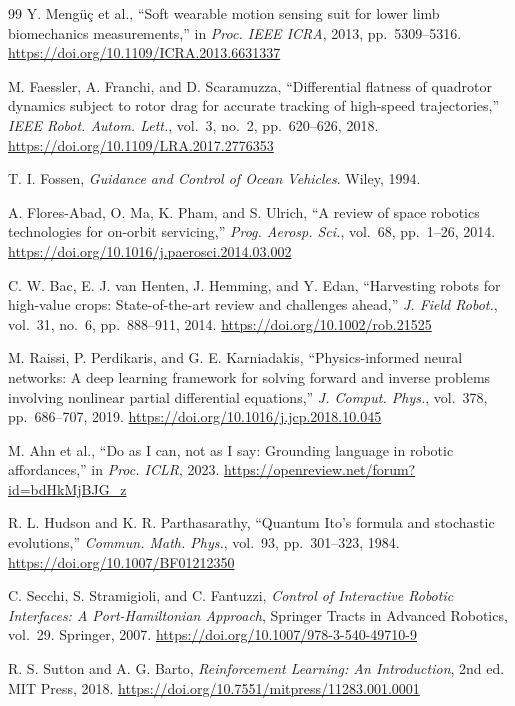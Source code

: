 \documentclass[11pt]{article}
\begin{document}
\begin{thebibliography}{99}
Y. Meng\"{u}\c{c} et al.,
``Soft wearable motion sensing suit for lower limb biomechanics
measurements,''
in \emph{Proc. IEEE ICRA}, 2013, pp.~5309--5316.
\url{https://doi.org/10.1109/ICRA.2013.6631337}

M. Faessler, A. Franchi, and D. Scaramuzza,
``Differential flatness of quadrotor dynamics subject to rotor drag for
accurate tracking of high-speed trajectories,''
\emph{IEEE Robot. Autom. Lett.}, vol.~3, no.~2, pp.~620--626, 2018.
\url{https://doi.org/10.1109/LRA.2017.2776353}

T. I. Fossen,
\emph{Guidance and Control of Ocean Vehicles}.
Wiley, 1994.

A. Flores-Abad, O. Ma, K. Pham, and S. Ulrich,
``A review of space robotics technologies for on-orbit servicing,''
\emph{Prog. Aerosp. Sci.}, vol.~68, pp.~1--26, 2014.
\url{https://doi.org/10.1016/j.paerosci.2014.03.002}

C. W. Bac, E. J. van Henten, J. Hemming, and Y. Edan,
``Harvesting robots for high-value crops: State-of-the-art review and
challenges ahead,''
\emph{J. Field Robot.}, vol.~31, no.~6, pp.~888--911, 2014.
\url{https://doi.org/10.1002/rob.21525}

M. Raissi, P. Perdikaris, and G. E. Karniadakis,
``Physics-informed neural networks: A deep learning framework for solving
forward and inverse problems involving nonlinear partial differential
equations,''
\emph{J. Comput. Phys.}, vol.~378, pp.~686--707, 2019.
\url{https://doi.org/10.1016/j.jcp.2018.10.045}

M. Ahn et al.,
``Do as I can, not as I say: Grounding language in robotic affordances,''
in \emph{Proc. ICLR}, 2023.
\url{https://openreview.net/forum?id=bdHkMjBJG_z}

R. L. Hudson and K. R. Parthasarathy,
``Quantum Ito's formula and stochastic evolutions,''
\emph{Commun. Math. Phys.}, vol.~93, pp.~301--323, 1984.
\url{https://doi.org/10.1007/BF01212350}

C. Secchi, S. Stramigioli, and C. Fantuzzi,
\emph{Control of Interactive Robotic Interfaces: A Port-Hamiltonian Approach},
Springer Tracts in Advanced Robotics, vol.~29. Springer, 2007.
\url{https://doi.org/10.1007/978-3-540-49710-9}

R. S. Sutton and A. G. Barto,
\emph{Reinforcement Learning: An Introduction}, 2nd ed. MIT Press, 2018.
\url{https://doi.org/10.7551/mitpress/11283.001.0001}


\end{thebibliography}
\end{document}
